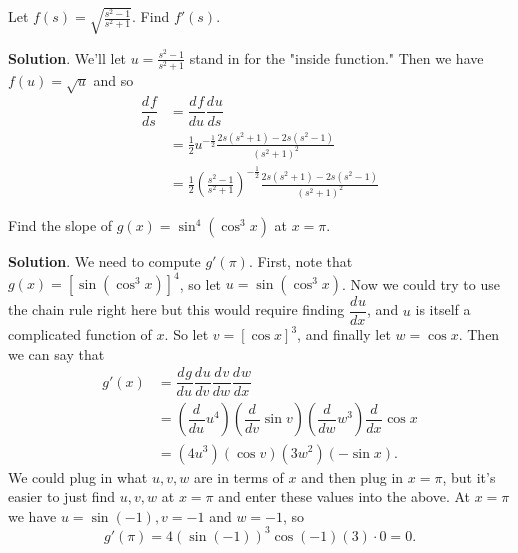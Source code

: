 \documentclass[10pt,]{book}
\theoremstyle{ptxplainnotitle}
\theoremstyle{ptxplaintitle}
\theoremstyle{ptxplainnotitle}
\theoremstyle{ptxplaintitle}
\theoremstyle{ptxplainnotitle}
\theoremstyle{ptxplaintitle}
\theoremstyle{ptxdefinitionnotitle}
\theoremstyle{ptxdefinitiontitle}
\theoremstyle{ptxdefinitionnotitle}
\theoremstyle{ptxdefinitiontitle}
\theoremstyle{ptxdefinitionnotitle}
\theoremstyle{ptxdefinitiontitle}
\theoremstyle{ptxdefinitionnotitle}
\theoremstyle{ptxdefinitiontitle}
\theoremstyle{ptxdefinitionnotitle}
\theoremstyle{ptxdefinitiontitle}
\numberwithin{equation}{section}
\newcommand{\dv}[3][]{\dfrac{d^{#1} #2}{d #3^{#1}}}
\begin{document}
\begin{example}\label{example-combining-rules}
\hypertarget{p-154}{}%
Let \(f(s) = \sqrt{\frac{s^{2} - 1}{s^{2} + 1}}\). Find \(f'(s)\).%
\par\smallskip%
\noindent\textbf{Solution}.\hypertarget{solution-31}{}\quad%
\hypertarget{p-155}{}%
We'll let \(u = \frac{s^{2}-1}{s^{2}+1}\) stand in for the "inside function." Then we have \(f(u) = \sqrt{u}\) and so%
\begin{align*}
\dv{f}{s} & = \dv{f}{u}\dv{u}{s} \\
& = \frac{1}{2}u^{-\frac{1}{2}}\frac{2s(s^{2}+1) - 2s(s^{2}-1)}{(s^{2}+1)^{2}} \\
& = \frac{1}{2}\left(\frac{s^{2}-1}{s^{2}+1}\right)^{-\frac{1}{2}}\frac{2s(s^{2}+1) - 2s(s^{2}-1)}{(s^{2}+1)^{2}} 
\end{align*}
%
\end{example}
\begin{example}\label{example-chain-rule-within-a-chain-rule}
\hypertarget{p-156}{}%
Find the slope of \(g(x) = \sin^{4}(\cos^{3}x)\) at \(x=\pi\).%
\par\smallskip%
\noindent\textbf{Solution}.\hypertarget{solution-32}{}\quad%
\hypertarget{p-157}{}%
We need to compute \(g'(\pi)\). First, note that \(g(x) = [\sin(\cos^{3}x)]^{4}\), so let \(u = \sin(\cos^{3}x)\). Now we could try to use the chain rule right here but this would require finding \(\dv{u}{x}\), and \(u\) is itself a complicated function of \(x\). So let \(v = [\cos x]^{3}\), and finally let \(w = \cos x\). Then we can say that%
\begin{align*}
g'(x) & = \dv{g}{u}\dv{u}{v}\dv{v}{w}\dv{w}{x} \\
& = \left(\dv{}{u}u^{4}\right)\left(\dv{}{v}\sin v\right)\left(\dv{}{w}w^{3}\right)\dv{}{x}\cos x \\
& = (4u^{3})(\cos v)(3w^{2})(-\sin x). 
\end{align*}
We could plug in what \(u,v,w\) are in terms of \(x\) and then plug in \(x=\pi\), but it's easier to just find \(u,v,w\) at \(x=\pi\) and enter these values into the above. At \(x=\pi\) we have \(u = \sin(-1), v = -1\) and \(w = -1\), so%
\begin{equation*}
g'(\pi) = 4(\sin(-1))^{3}\cos(-1)(3)\cdot0 = 0.
\end{equation*}
%
\end{example}
\typeout{************************************************}
\typeout{************************************************}
\end{document}
